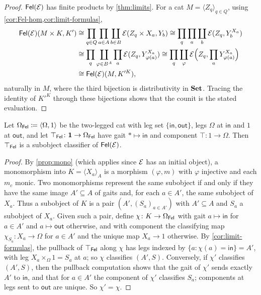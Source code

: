 \begin{proof}
$\mathsf{Fel}(\mathcal{E})$ has finite products by \cref{thm:limits}. For a cat
$M=\langle Z_q\rangle_{q\in Q}$, using \cref{cor:Fel-hom,cor:limit-formulas},
\begin{align*}
\mathsf{Fel}(\mathcal{E})(M\times K,K')&\cong\prod_{q\in Q}\prod_{a\in A}\coprod_{b\in B}\mathcal{E}(Z_q\times X_a,Y_b)
\cong\prod_{q}\prod_{a}\coprod_{b}\mathcal{E}(Z_q,Y_b^{X_a})\\
&\cong\prod_{q}\coprod_{\varphi\in B^A}\prod_{a}\mathcal{E}(Z_q,Y_{\varphi(a)}^{X_a})
\cong\prod_q\coprod_{\varphi}\mathcal{E}\Bigl(Z_q,\prod_aY_{\varphi(a)}^{X_a}\Bigr)\\
&\cong\mathsf{Fel}(\mathcal{E})(M,K'^K),
\end{align*}
naturally in $M$, where the third bijection is distributivity in $\mathbf{Set}$. Tracing
the identity of $K'^K$ through these bijections shows that the counit is the
stated evaluation.
\end{proof}

\begin{proposition}\label{prop:classifier}
Let $\Omega_{\mathsf{Fel}}\coloneqq\langle\Omega,1\rangle$ be the two-legged cat with leg
set $\{\mathsf{in},\mathsf{out}\}$, legs $\Omega$ at $\mathsf{in}$ and $1$ at
$\mathsf{out}$, and let $\top_{\mathsf{Fel}}\colon\mathbf{1}\to\Omega_{\mathsf{Fel}}$ have gait
$*\mapsto\mathsf{in}$ and component $\top\colon1\to\Omega$. Then
$\top_{\mathsf{Fel}}$ is a subobject classifier of $\mathsf{Fel}(\mathcal{E})$.
\end{proposition}

\begin{proof}
By \cref{prop:mono} (which applies since $\mathcal{E}$ has an initial object), a
monomorphism into $K=\langle X_a\rangle_A$ is a morphism $(\varphi,m)$ with
$\varphi$ injective and each $m_c$ monic. Two monomorphisms represent the same
subobject if and only if they have the same image $A'\subseteq A$ of gaits and,
for each $a\in A'$, the same subobject of $X_a$. Thus a subobject of $K$ is a
pair $(A',(S_a)_{a\in A'})$ with $A'\subseteq A$ and $S_a$ a subobject of $X_a$.
Given such a pair, define $\chi\colon K\to\Omega_{\mathsf{Fel}}$ with gait
$a\mapsto\mathsf{in}$ for $a\in A'$ and $a\mapsto\mathsf{out}$ otherwise, and with
component the classifying map $\chi_{S_a}\colon X_a\to\Omega$ for $a\in A'$ and
the unique map $X_a\to1$ otherwise. By \cref{cor:limit-formulas}, the
pullback of $\top_{\mathsf{Fel}}$ along $\chi$ has legs indexed by
$\{a:\chi(a)=\mathsf{in}\}=A'$, with leg $X_a\times_\Omega1=S_a$ at $a$; so
$\chi$ classifies $(A',S)$. Conversely, if $\chi'$ classifies $(A',S)$, then
the pullback computation shows that the gait of $\chi'$ sends exactly $A'$ to
$\mathsf{in}$, and that for $a\in A'$ the component of $\chi'$ classifies $S_a$;
components at legs sent to $\mathsf{out}$ are unique. So $\chi'=\chi$.
\end{proof}

